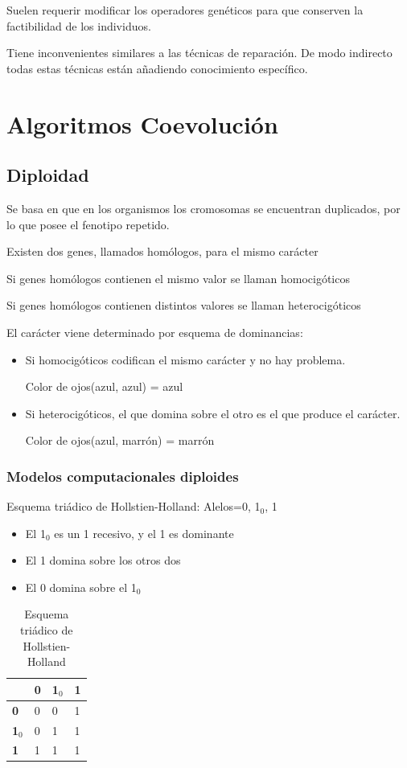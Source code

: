 \documentclass[12pt, twoside, openright]{report} %
\begin{document}
Suelen requerir modificar los operadores genéticos para que conserven la factibilidad de los individuos.

Tiene inconvenientes similares a las técnicas de reparación. De modo indirecto todas estas técnicas están añadiendo conocimiento específico.

\section{Algoritmos Coevolución}
\subsection{Diploidad}
Se basa en que en los organismos los cromosomas se encuentran duplicados, por lo que posee el fenotipo repetido.

Existen dos genes, llamados homólogos, para el mismo carácter

Si genes homólogos contienen el mismo valor se llaman homocigóticos

Si genes homólogos contienen distintos valores se llaman heterocigóticos

El carácter viene determinado por esquema de dominancias:
\begin{itemize}
	\item Si homocigóticos codifican el mismo carácter y no hay problema. 
	
	Color de ojos(azul, azul) = azul
	\item Si heterocigóticos, el que domina sobre el otro es el que produce el carácter. 
	
	Color de ojos(azul, marrón) = marrón
\end{itemize}

\subsubsection{Modelos computacionales diploides}
Esquema triádico de Hollstien-Holland: Alelos={0, 1$_0$, 1}
\begin{itemize}
	\item El 1$_0$ es un 1 recesivo, y el 1 es dominante
	\item El 1 domina sobre los otros dos
	\item El 0 domina sobre el 1$_0$
\end{itemize} 
\begin{table}[H]
	\centering
	\caption{Esquema triádico de Hollstien-Holland}
	\begin{tabular}{l|l|l|l|}
	\cline{2-4}
	& \textbf{0} & \textbf{1$_0$} & \textbf{1} \\ \hline
	\multicolumn{1}{|l|}{\textbf{0}} & 0 & 0 & 1 \\ \hline
	\multicolumn{1}{|l|}{\textbf{1$_0$}} & 0 & 1 & 1 \\ \hline
	\multicolumn{1}{|l|}{\textbf{1}} & 1 & 1 & 1 \\ \hline
	\end{tabular}
\end{table}
\pagebreak
\end{document}
